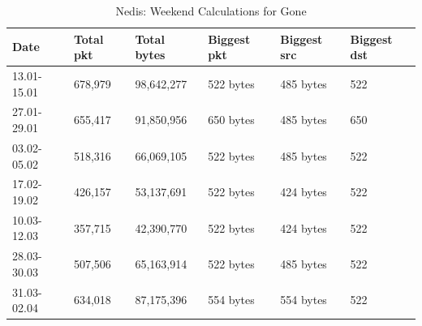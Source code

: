 \begin{table}[H]
    \caption{Nedis: Weekend Calculations for Gone}
    \begin{tabular}{|l|l|l|l|l|l|}
        \hline
        \textbf{Date}    & \textbf{Total pkt} & \textbf{Total bytes} & \textbf{Biggest pkt} & \textbf{Biggest src} & \textbf{Biggest dst} \\ \hline
        13.01-15.01      & 678,979            & 98,642,277           & 522 bytes            & 485 bytes            & 522                  \\ \hline
        27.01-29.01      & 655,417            & 91,850,956           & 650 bytes            & 485 bytes            & 650                  \\ \hline
        03.02-05.02      & 518,316            & 66,069,105           & 522 bytes            & 485 bytes            & 522                  \\ \hline
        17.02-19.02      & 426,157            & 53,137,691           & 522 bytes            & 424 bytes            & 522                  \\ \hline
        10.03-12.03      & 357,715            & 42,390,770           & 522 bytes            & 424 bytes            & 522                  \\ \hline
        28.03-30.03      & 507,506            & 65,163,914           & 522 bytes            & 485 bytes            & 522                  \\ \hline
        31.03-02.04      & 634,018            & 87,175,396           & 554 bytes            & 554 bytes            & 522                  \\ \hline
    \end{tabular}
    \label{tab:NedisHomeWeekends}
\end{table}

